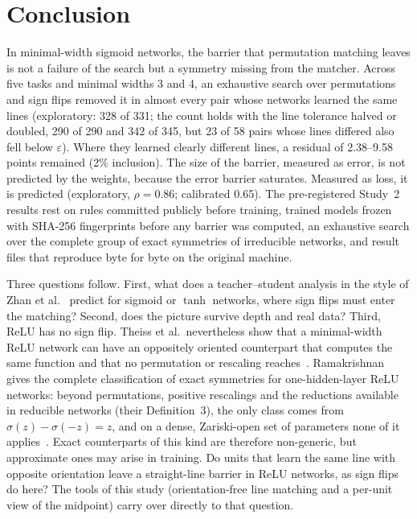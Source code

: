 \documentclass[11pt]{article}
\newcommand{\eps}{\varepsilon}
\begin{document}
\section{Conclusion}

In minimal-width sigmoid networks, the barrier that permutation matching leaves is not a failure of the search but a symmetry missing from the matcher. Across five tasks and minimal widths 3 and 4, an exhaustive search over permutations and sign flips removed it in almost every pair whose networks learned the same lines (exploratory: 328 of 331; the count holds with the line tolerance halved or doubled, 290 of 290 and 342 of 345, but 23 of 58 pairs whose lines differed also fell below $\eps$). Where they learned clearly different lines, a residual of 2.38--9.58 points remained (2\% inclusion). The size of the barrier, measured as error, is not predicted by the weights, because the error barrier saturates. Measured as loss, it is predicted (exploratory, $\rho = 0.86$; calibrated 0.65). The pre-registered Study~2 results rest on rules committed publicly before training, trained models frozen with SHA-256 fingerprints before any barrier was computed, an exhaustive search over the complete group of exact symmetries of irreducible networks, and result files that reproduce byte for byte on the original machine.

Three questions follow. First, what does a teacher--student analysis in the style of Zhan et al.~\cite{zhan2025analyzing} predict for sigmoid or $\tanh$ networks, where sign flips must enter the matching? Second, does the picture survive depth and real data? Third, ReLU has no sign flip. Theiss et al.\ nevertheless show that a minimal-width ReLU network can have an oppositely oriented counterpart that computes the same function and that no permutation or rescaling reaches~\cite[Example~B.13]{theiss2026parameter}. Ramakrishnan gives the complete classification of exact symmetries for one-hidden-layer ReLU networks: beyond permutations, positive rescalings and the reductions available in reducible networks (their Definition~3), the only class comes from $\sigma(z) - \sigma(-z) = z$, and on a dense, Zariski-open set of parameters none of it applies~\cite[Theorems~1, 3 and~5]{ramakrishnan2026complete}. Exact counterparts of this kind are therefore non-generic, but approximate ones may arise in training. Do units that learn the same line with opposite orientation leave a straight-line barrier in ReLU networks, as sign flips do here? The tools of this study (orientation-free line matching and a per-unit view of the midpoint) carry over directly to that question.
\end{document}
